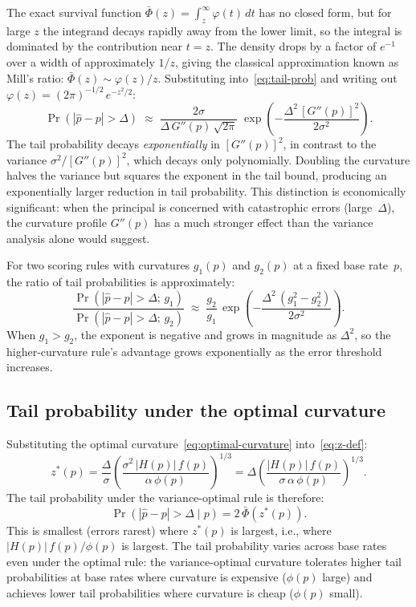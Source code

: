 \documentclass[11pt]{article}
\begin{document}
The exact survival function $\bar{\Phi}(z) = \int_z^{\infty} \varphi(t)\,dt$ has no closed form, but for large $z$ the integrand decays rapidly away from the lower limit, so the integral is dominated by the contribution near $t = z$. The density drops by a factor of $e^{-1}$ over a width of approximately $1/z$, giving the classical approximation known as Mill's ratio: $\bar{\Phi}(z) \sim \varphi(z)/z$. Substituting into~\eqref{eq:tail-prob} and writing out $\varphi(z) = (2\pi)^{-1/2}\,e^{-z^2/2}$:
\begin{equation}\label{eq:tail-mill}
	\Pr(|\hat{p} - p| > \Delta) \;\approx\; \frac{2\sigma}{\Delta\,G''(p)\,\sqrt{2\pi}} \;\exp\!\left(-\frac{\Delta^2\,[G''(p)]^2}{2\sigma^2}\right).
\end{equation}
The tail probability decays \emph{exponentially} in $[G''(p)]^2$, in contrast to the variance $\sigma^2/[G''(p)]^2$, which decays only polynomially. Doubling the curvature halves the variance but squares the exponent in the tail bound, producing an exponentially larger reduction in tail probability. This distinction is economically significant: when the principal is concerned with catastrophic errors (large~$\Delta$), the curvature profile $G''(p)$ has a much stronger effect than the variance analysis alone would suggest.

For two scoring rules with curvatures $g_1(p)$ and $g_2(p)$ at a fixed base rate~$p$, the ratio of tail probabilities is approximately:
\begin{equation}\label{eq:tail-ratio}
	\frac{\Pr(|\hat{p} - p| > \Delta;\, g_1)}{\Pr(|\hat{p} - p| > \Delta;\, g_2)} \;\approx\; \frac{g_2}{g_1}\,\exp\!\left(-\frac{\Delta^2\,(g_1^2 - g_2^2)}{2\sigma^2}\right).
\end{equation}
When $g_1 > g_2$, the exponent is negative and grows in magnitude as $\Delta^2$, so the higher-curvature rule's advantage grows exponentially as the error threshold increases.

\subsection{Tail probability under the optimal curvature}

Substituting the optimal curvature~\eqref{eq:optimal-curvature} into~\eqref{eq:z-def}:
\begin{equation}\label{eq:z-star}
z^*(p) = \frac{\Delta}{\sigma} \left(\frac{\sigma^2\,|H(p)|\,f(p)}{\alpha\,\phi(p)}\right)^{\!1/3} = \Delta\left(\frac{|H(p)|\,f(p)}{\sigma\,\alpha\,\phi(p)}\right)^{\!1/3}.
\end{equation}
The tail probability under the variance-optimal rule is therefore:
\begin{equation}\label{eq:tail-optimal-rule}
\Pr(|\hat{p} - p| > \Delta \mid p) = 2\,\bar{\Phi}(z^*(p)).
\end{equation}
This is smallest (errors rarest) where $z^*(p)$ is largest, i.e., where $|H(p)|\,f(p)/\phi(p)$ is largest. The tail probability varies across base rates even under the optimal rule: the variance-optimal curvature tolerates higher tail probabilities at base rates where curvature is expensive ($\phi(p)$ large) and achieves lower tail probabilities where curvature is cheap ($\phi(p)$ small).
\end{document}
